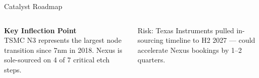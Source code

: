 \documentclass[10pt,aspectratio=169]{beamer}
\begin{document}
\begin{frame}{Catalyst Roadmap}
\begin{columns}[T,onlytextwidth]
      \vspace{6pt}
      \begin{block}{}
        \centering
        {\footnotesize\bfseries\color{navy}Key Inflection Point}\\[4pt]
        {\small TSMC N3 represents the largest node transition since 7nm in 2018.}
        {\small Nexus is sole-sourced on 4 of 7 critical etch steps.}
      \end{block}

      \vspace{6pt}
      {\footnotesize\color{dtext!70}\faExclamationTriangle\hspace{4pt}Risk: Texas Instruments pulled in-sourcing timeline to H2 2027 — could accelerate Nexus bookings by 1–2 quarters.}
  \end{columns}

\end{frame}
\end{document}

